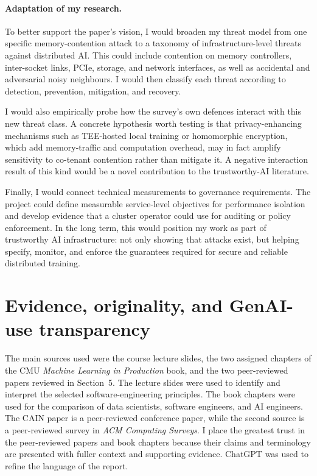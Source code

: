 \documentclass{article}
\begin{document}
\paragraph{Adaptation of my research.}

To better support the paper's vision, I would broaden my threat model from one
specific memory-contention attack to a taxonomy of infrastructure-level threats
against distributed AI. This could include contention on memory controllers,
inter-socket links, PCIe, storage, and network interfaces, as well as
accidental and adversarial noisy neighbours. I would then classify each threat
according to detection, prevention, mitigation, and recovery.

I would also empirically probe how the survey's own defences interact with
this new threat class. A concrete hypothesis worth testing is that
privacy-enhancing mechanisms such as TEE-hosted local training or homomorphic
encryption, which add memory-traffic and computation overhead, may in fact
amplify sensitivity to co-tenant contention rather than mitigate it. A
negative interaction result of this kind would be a novel contribution to the
trustworthy-AI literature.

Finally, I would connect technical measurements to governance requirements.
The project could define measurable service-level objectives for performance
isolation and develop evidence that a cluster operator could use for auditing
or policy enforcement. In the long term, this would position my work as part
of trustworthy AI infrastructure: not only showing that attacks exist, but
helping specify, monitor, and enforce the guarantees required for secure and
reliable distributed training.


\section{Evidence, originality, and GenAI-use transparency}
The main sources used were the course lecture slides, the two assigned
chapters of the CMU \emph{Machine Learning in Production} book, and the two
peer-reviewed papers reviewed in Section~5. The lecture slides were used to
identify and interpret the selected software-engineering principles. The book
chapters were used for the comparison of data scientists, software engineers,
and AI engineers. The CAIN paper is a peer-reviewed conference paper, while
the second source is a peer-reviewed survey in \emph{ACM Computing Surveys}.
I place the greatest trust in the peer-reviewed papers and book chapters
because their claims and terminology are presented with fuller context and
supporting evidence. ChatGPT was used to refine the language of the report. 



\printbibliography
\end{document}

